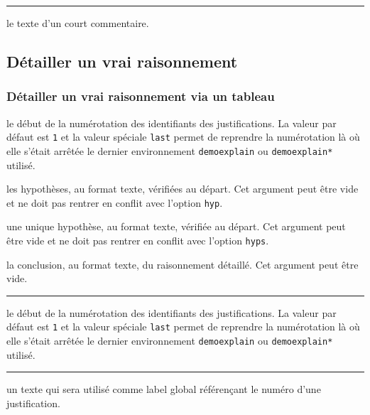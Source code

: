 \documentclass[12pt,a4paper]{article}
\newcommand\env[1]{\texttt{#1}}
\theoremstyle{definition}
\newcommand\separation{
	\medskip
	\hfill\rule{0.5\textwidth}{0.75pt}\hfill
	\medskip
}
\begin{document}
\separation



\IDarg{} le texte d'un court commentaire.








\subsection{Détailler un \og vrai \fg{} raisonnement}



\subsubsection{Détailler un \og vrai \fg{} raisonnement via un tableau}


 le début de la numérotation des identifiants des justifications.
              La valeur par défaut est \verb+1+ et la valeur spéciale \verb+last+ permet de reprendre la numérotation là où elle s'était arrêtée le dernier environnement \env{demoexplain} ou \env{demoexplain*} utilisé.

 les hypothèses, au format texte, vérifiées au départ.
              Cet argument peut être vide et ne doit pas rentrer en conflit avec l'option \verb+hyp+.

 une unique hypothèse, au format texte, vérifiée au départ.
              Cet argument peut être vide et ne doit pas rentrer en conflit avec l'option \verb+hyps+.

 la conclusion, au format texte, du raisonnement détaillé.
              Cet argument peut être vide.


\separation



 le début de la numérotation des identifiants des justifications.
              La valeur par défaut est \verb+1+ et la valeur spéciale \verb+last+ permet de reprendre la numérotation là où elle s'était arrêtée le dernier environnement \env{demoexplain} ou \env{demoexplain*} utilisé.


\separation



\IDoption{} un texte qui sera utilisé comme label global référençant le numéro d'une justification.
\end{document}
